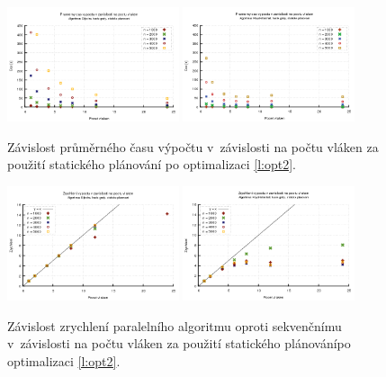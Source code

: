 \begin{figure}
    \centering
    \includegraphics[width=0.45\textwidth]{../grafy/02_openMP/02-01-Dijkstra_cas_v3}
    \includegraphics[width=0.45\textwidth]{../grafy/02_openMP/02-01-Floyd_cas_v3}
    \caption{Závislost průměrného času výpočtu v~závislosti na počtu vláken za použití statického plánování po optimalizaci \ref{l:opt2}.}
    \label{f:mer:cas:opt2}
\end{figure}

\begin{figure}
    \centering
    \includegraphics[width=0.45\textwidth]{../grafy/02_openMP/02-02-Dijkstra_zrychleni_v3}
    \includegraphics[width=0.45\textwidth]{../grafy/02_openMP/02-02-Floyd_zrychleni_v3}
    \caption{Závislost zrychlení paralelního algoritmu oproti sekvenčnímu v~závislosti na počtu vláken za použití statického plánovánípo optimalizaci \ref{l:opt2}.}
    \label{f:mer:zry:opt2}
\end{figure}

